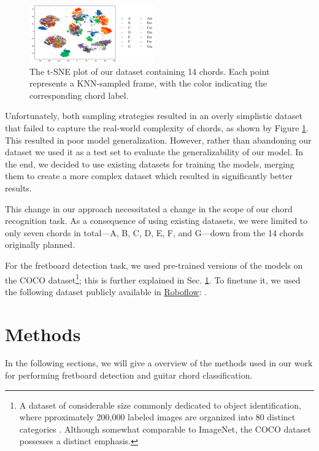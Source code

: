 \documentclass[10pt,twocolumn,letterpaper]{article}
\begin{document}
\begin{figure}[h]
    \centering
    \includegraphics[width=0.48\textwidth]{images/final/Guitar-chords-ours_t-sne_plot.png}
    \caption{The t-SNE plot of our dataset containing 14 chords. Each point represents a KNN-sampled frame, with the color indicating the corresponding chord label.}
    \label{fig:ours-tsne-plot}
\end{figure}

Unfortunately, both sampling strategies resulted in an overly simplistic dataset that failed to capture the real-world complexity of chords, as shown by Figure \ref{fig:ours-tsne-plot}. This resulted in poor model generalization. However, rather than abandoning our dataset we used it as a test set to evaluate the generalizability of our model. In the end, we decided to use existing datasets \cite{guitar-chord-tvon8_dataset,guitar-chord-bounding-box_dataset, guitar-chord-handshape_dataset, guitar-chords-daewp_dataset} for training the models, merging them to create a more complex dataset which resulted in significantly better results.

This change in our approach necessitated a change in the scope of our chord recognition task. As a consequence of using existing datasets, we were limited to only seven chords in total—A, B, C, D, E, F, and G—down from the 14 chords originally planned.

For the fretboard detection task, we used pre-trained versions of the models on the COCO dataset\footnote{A dataset of considerable size commonly dedicated to object identification, where pproximately 200,000 labeled images are organized into 80 distinct categories \cite{lin2015microsoftcococommonobjects}. Although somewhat comparable to ImageNet, the COCO dataset possesses a distinct emphasis.}; this is further explained in Sec. \ref{sec:methods}. To finetune it, we used the following dataset publicly available in \href{https://universe.roboflow.com/}{Roboflow}: \cite{guitar-necks-detector}.

\section{Methods}\label{sec:methods}
In the following sections, we will give a overview of the methods used in our work for performing fretboard detection and guitar chord classification.
\end{document}
